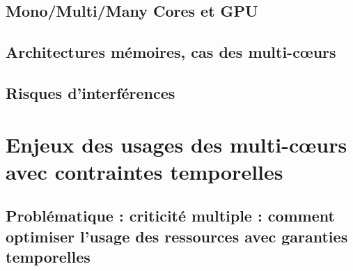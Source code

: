 \subsection{Mono/Multi/Many Cores et GPU}
\subsection{Architectures mémoires, cas des multi-c\oe{}urs}
\subsection{Risques d'interférences}


\section{Enjeux des usages des multi-c\oe{}urs avec contraintes temporelles}
\subsection{Problématique :  criticité multiple : comment optimiser l'usage des ressources avec garanties temporelles}
